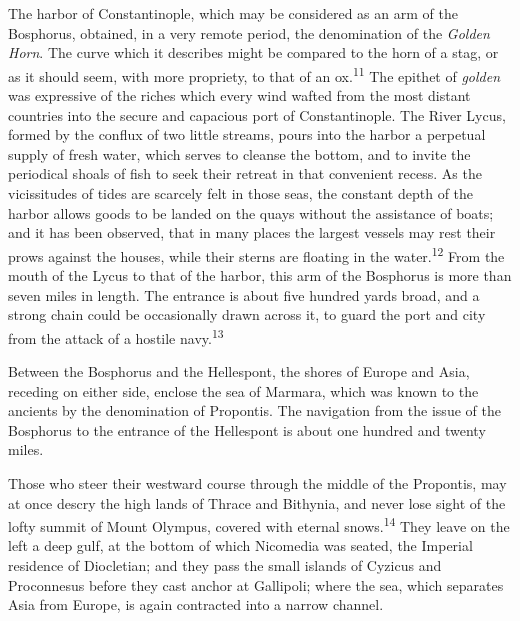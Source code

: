 The harbor of Constantinople, which may be considered as an arm
of the Bosphorus, obtained, in a very remote period, the
denomination of the \textit{Golden Horn}. The curve which it describes
might be compared to the horn of a stag, or as it should seem,
with more propriety, to that of an ox.\textsuperscript{11} The epithet of \textit{golden}
was expressive of the riches which every wind wafted from the
most distant countries into the secure and capacious port of
Constantinople. The River Lycus, formed by the conflux of two
little streams, pours into the harbor a perpetual supply of fresh
water, which serves to cleanse the bottom, and to invite the
periodical shoals of fish to seek their retreat in that
convenient recess. As the vicissitudes of tides are scarcely felt
in those seas, the constant depth of the harbor allows goods to
be landed on the quays without the assistance of boats; and it
has been observed, that in many places the largest vessels may
rest their prows against the houses, while their sterns are
floating in the water.\textsuperscript{12} From the mouth of the Lycus to that of
the harbor, this arm of the Bosphorus is more than seven miles in
length. The entrance is about five hundred yards broad, and a
strong chain could be occasionally drawn across it, to guard the
port and city from the attack of a hostile navy.\textsuperscript{13}




Between the Bosphorus and the Hellespont, the shores of Europe
and Asia, receding on either side, enclose the sea of Marmara,
which was known to the ancients by the denomination of Propontis.
The navigation from the issue of the Bosphorus to the entrance of
the Hellespont is about one hundred and twenty miles.

Those who steer their westward course through the middle of the
Propontis, may at once descry the high lands of Thrace and
Bithynia, and never lose sight of the lofty summit of Mount
Olympus, covered with eternal snows.\textsuperscript{14} They leave on the left a
deep gulf, at the bottom of which Nicomedia was seated, the
Imperial residence of Diocletian; and they pass the small islands
of Cyzicus and Proconnesus before they cast anchor at Gallipoli;
where the sea, which separates Asia from Europe, is again
contracted into a narrow channel.

